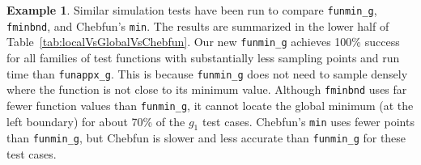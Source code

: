 \documentclass[review]{elsarticle}
\theoremstyle{definition}
\newtheorem{exmp}{Example}
\newcommand{\funappxg}{\texttt{funappx\_g}\xspace}
\newcommand{\funming}{\texttt{funmin\_g}\xspace}
\newcommand{\fminbnd}{\texttt{fminbnd}\xspace}
\begin{document}
\begin{exmp}

Similar simulation tests have been run to compare \funming, \fminbnd, and
Chebfun's \texttt{min}. The results are summarized in the lower half of
Table~\ref{tab:localVsGlobalVsChebfun}. Our new \funming{} achieves 100\%
success for all families of test functions with substantially less sampling
points and run time than \funappxg. This is because \funming does not need to
sample densely where the function is not close to its minimum value. Although
\fminbnd uses far fewer function values than \funming, it cannot locate the
global minimum (at the left boundary) for about 70\% of the $g_1$ test cases.
Chebfun's {\tt min} uses fewer points than \funming, but Chebfun is slower and
less accurate than \funming for these test cases.

\end{exmp}
\end{document}
